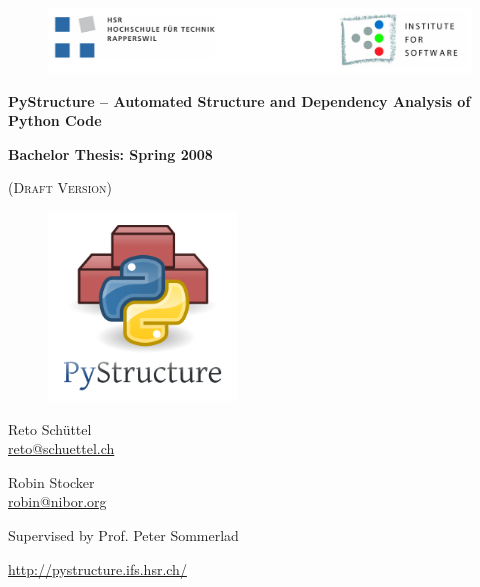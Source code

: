 \documentclass[12pt,halfparskip,DIV11,BCOR10mm]{scrreprt}
\begin{document}
\begin{titlepage}

\thispagestyle{empty}

\begin{center}

\begin{figure}[h]
 \centering
 \vspace{0,5cm}
 \includegraphics[width=\textwidth]{img/hsr_logo}
\end{figure}

\vspace{1cm}
{\Huge \bfseries PyStructure -- Automated Structure and Dependency Analysis of Python Code}

\vspace{0,5cm}
{\Large \bfseries Bachelor Thesis: Spring 2008}

\vspace{0,5cm}
\SVNDate{} (\textsc{Draft Version}) %

\vspace{0.5cm}
\begin{figure}[h]
 \centering
 \includegraphics[width=5cm]{img/pystructure}
\end{figure}

\vspace{0.5cm}
Reto Schüttel \\ \url{reto@schuettel.ch}

\vspace{0,4cm}
Robin Stocker \\ \url{robin@nibor.org}

\vspace{0,4cm}
Supervised by Prof. Peter Sommerlad %


\vspace{1cm}
\url{http://pystructure.ifs.hsr.ch/}

\end{center}
\end{titlepage}
\end{document}
